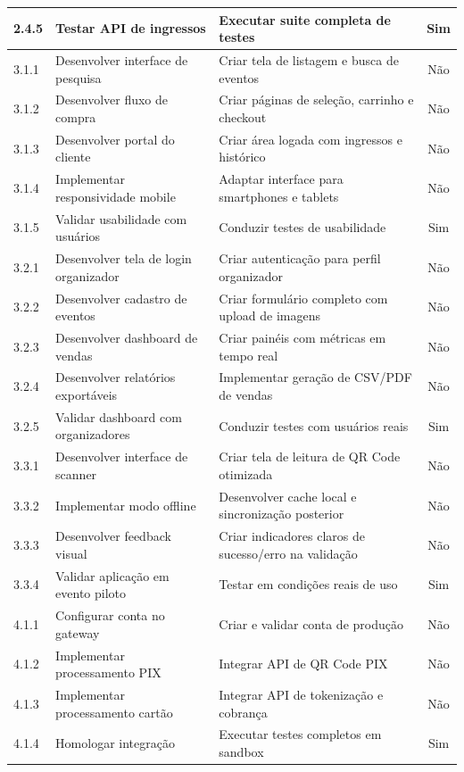 \begin{table}[H]
\begin{tabular}{|p{0.9cm}|p{6.2cm}|p{5.7cm}|c|}
2.4.5 & Testar API de ingressos & Executar suite completa de testes & Sim \\ \hline
3.1.1 & Desenvolver interface de pesquisa & Criar tela de listagem e busca de eventos & Não \\ \hline
3.1.2 & Desenvolver fluxo de compra & Criar páginas de seleção, carrinho e checkout & Não \\ \hline
3.1.3 & Desenvolver portal do cliente & Criar área logada com ingressos e histórico & Não \\ \hline
3.1.4 & Implementar responsividade mobile & Adaptar interface para smartphones e tablets & Não \\ \hline
3.1.5 & Validar usabilidade com usuários & Conduzir testes de usabilidade & Sim \\ \hline
3.2.1 & Desenvolver tela de login organizador & Criar autenticação para perfil organizador & Não \\ \hline
3.2.2 & Desenvolver cadastro de eventos & Criar formulário completo com upload de imagens & Não \\ \hline
3.2.3 & Desenvolver dashboard de vendas & Criar painéis com métricas em tempo real & Não \\ \hline
3.2.4 & Desenvolver relatórios exportáveis & Implementar geração de CSV/PDF de vendas & Não \\ \hline
3.2.5 & Validar dashboard com organizadores & Conduzir testes com usuários reais & Sim \\ \hline
3.3.1 & Desenvolver interface de scanner & Criar tela de leitura de QR Code otimizada & Não \\ \hline
3.3.2 & Implementar modo offline & Desenvolver cache local e sincronização posterior & Não \\ \hline
3.3.3 & Desenvolver feedback visual & Criar indicadores claros de sucesso/erro na validação & Não \\ \hline
3.3.4 & Validar aplicação em evento piloto & Testar em condições reais de uso & Sim \\ \hline
4.1.1 & Configurar conta no gateway & Criar e validar conta de produção & Não \\ \hline
4.1.2 & Implementar processamento PIX & Integrar API de QR Code PIX & Não \\ \hline
4.1.3 & Implementar processamento cartão & Integrar API de tokenização e cobrança & Não \\ \hline
4.1.4 & Homologar integração & Executar testes completos em sandbox & Sim \\ \hline

\end{tabular}
\end{table}
